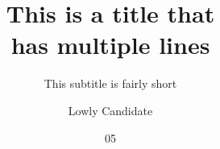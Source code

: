 \documentclass[chap,comply,bibliography=totoc]{uc-dissertation}
\title{This is a title that \\ has multiple lines}
\subtitle{This subtitle is fairly short}
\date{05}{2015}
\author{Lowly Candidate}
\theoremstyle{definition}
\numberwithin{equation}{section}
\begin{document}
 



\frontmatter

\maketitle      %

\abstractpage

\copyrightpage


\acknowledgmentspage
\end{document}

